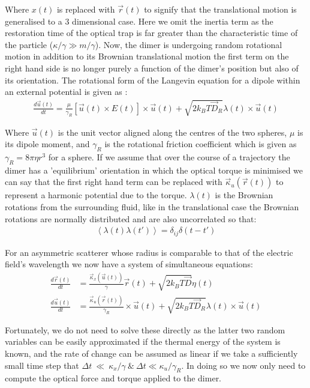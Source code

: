 Where $x(t)$ is replaced with $\vec{r}(t)$ to signify that the translational 
motion is generalised to a 3 dimensional case. Here we omit the inertia term 
as the restoration time of the optical trap is far greater than the characteristic time of the particle ($\kappa/\gamma \gg m/\gamma$). Now, the dimer is undergoing random rotational motion in addition to its Brownian 
translational motion the first term on the right hand side is no longer 
purely a function of the dimer's position but also of its orientation. 
The rotational form of the Langevin equation for a dipole within an external 
potential is given as \cite{Mazo2008}:
\begin{align}
	\frac{{d}\vec{u}(t)}{{dt}}
	=
	\frac{\mu}{\gamma_R}\left[\vec{u}(t)\times E(t)\right]\times \vec{u}(t)
	+ \sqrt{2k_BT\vec{D}_R}\lambda(t)\times \vec{u}(t)
\end{align}

Where $\vec{u}(t)$ is the unit vector aligned along the centres of 
the two spheres, $\mu$ is its dipole moment, and $\gamma_R$ is the 
rotational friction coefficient which is given as $\gamma_R = 8\pi
\eta r^3$ for a sphere. If we assume that over the course of a 
trajectory the dimer has a 'equilibrium' orientation in which the 
optical torque is minimised we can say that the first right hand 
term can be replaced with $\vec{\kappa}_u(\vec{r}(t))$ to represent
a harmonic potential due to the torque. $\lambda(t)$ is the Brownian 
rotations from the surrounding fluid, like in the translational case 
the Brownian rotations are normally distributed and are also uncorrelated 
so that:
\begin{align}
	\left<\lambda(t)\lambda(t')\right> = \delta_{ij}\delta(t-t')
\end{align}

For an asymmetric scatterer whose radius is comparable to that of the 
electric field's wavelength we now have a system of simultaneous equations:
\begin{align}
	\label{eq:full_langevin}
	\frac{{d}\vec{r}(t)}{{dt}}
	&=
	\frac{\vec{\kappa}_x(\vec{u}(t))}{\gamma}\vec{r}(t) + \sqrt{2k_BT\vec{D}}\eta(t)
	\\
	\frac{{d}\vec{u}(t)}{{dt}}
	&=
	\frac{\vec{\kappa}_u(\vec{r}(t))}{\gamma_R}\times \vec{u}(t)
	+ \sqrt{2k_BT\vec{D}_R}\lambda(t)\times \vec{u}(t)
\end{align}

Fortunately, we do not need to solve these directly as the latter two
random variables can be easily approximated if the thermal energy of
the system is known, and the rate of change can be assumed as linear if
we take a sufficiently small time step that $\Delta t~\ll~\kappa_x/\gamma 
\ \& \ \Delta t \ll \kappa_u/\gamma_R$. In doing so we now only need 
to compute the optical force and torque applied to the dimer. 

